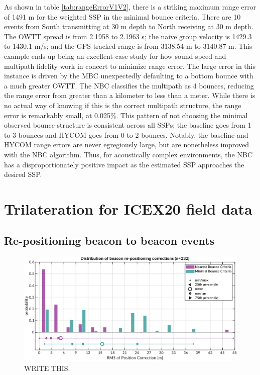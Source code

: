 As shown in table \ref{tab:rangeErrorV1V2}, there is a striking maximum range error of 1491 m for the weighted SSP in the minimal bounce criteria.
There are 10 events from South transmitting at 30 m depth to North receiving at 30 m depth.
The OWTT spread is from 2.1958 to 2.1963 s; the naive group velocity is 1429.3 to 1430.1 m/s; and the GPS-tracked range is from 3138.54 m to 3140.87 m.
This example ends up being an excellent case study for how sound speed and multipath fidelity work in concert to minimize range error.
The large error in this instance is driven by the MBC unexpectedly defaulting to a bottom bounce with a much greater OWTT.
The NBC classifies the multipath as 4 bounces, reducing the range error from greater than a kilometer to less than a meter.
While there is no actual way of knowing if this is the correct multipath structure, the range error is remarkably small, at 0.025\%. 
This pattern of not choosing the minimal observed bounce structure is consistent across all SSPs; the baseline goes from 1 to 3 bounces and HYCOM goes from 0 to 2 bounces.
Notably, the baseline and HYCOM range errors are never egregiously large, but are nonetheless improved with the NBC algorithm.
Thus, for acoustically complex environments, the NBC has a disproportionately positive impact as the estimated SSP approaches the desired SSP.

\clearpage
\section{Trilateration for ICEX20 field data}\label{sec:trilat}

\subsection{Re-positioning beacon to beacon events}

\begin{figure}[!ht]
\includegraphics[width=\textwidth]{figs/beacon-trilat-stat.pdf}
\caption{WRITE THIS.}
\label{fig:trilat-beacon}
\end{figure}

